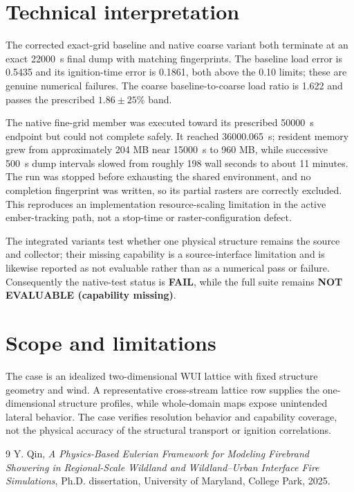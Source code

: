 \section{Technical interpretation}
The corrected exact-grid baseline and native coarse variant both terminate at
an exact \SI{22000}{s} final dump with matching fingerprints.  The baseline
load error is 0.5435 and its ignition-time error is 0.1861, both above the
0.10 limits; these are genuine numerical failures.  The coarse
baseline-to-coarse load ratio is 1.622 and passes the prescribed
\(1.86\pm25\%\) band.

The native fine-grid member was executed toward its prescribed
\SI{50000}{s} endpoint but could not complete safely.  It reached
\SI{36000.065}{s}; resident memory grew from approximately 204 MB near
\SI{15000}{s} to 960 MB, while successive \SI{500}{s} dump intervals slowed
from roughly 198 wall seconds to about 11 minutes.  The run was stopped before
exhausting the shared environment, and no completion fingerprint was written,
so its partial rasters are correctly excluded.  This reproduces an
implementation resource-scaling limitation in the active ember-tracking path,
not a stop-time or raster-configuration defect.

The integrated variants test whether one physical structure remains the source
and collector; their missing capability is a source-interface limitation and
is likewise reported as not evaluable rather than as a numerical pass or
failure.  Consequently the native-test status is \textbf{FAIL}, while the full
suite remains \textbf{NOT EVALUABLE (capability missing)}.

\section{Scope and limitations}
The case is an idealized two-dimensional WUI lattice with fixed structure geometry and wind. A representative cross-stream lattice row supplies the one-dimensional structure profiles, while whole-domain maps expose unintended lateral behavior. The case verifies resolution behavior and capability coverage, not the physical accuracy of the structural transport or ignition correlations.

\begin{thebibliography}{9}
Y. Qin, \emph{A Physics-Based Eulerian Framework for Modeling Firebrand
Showering in Regional-Scale Wildland and Wildland--Urban Interface Fire
Simulations}, Ph.D. dissertation, University of Maryland, College Park, 2025.
\end{thebibliography}
